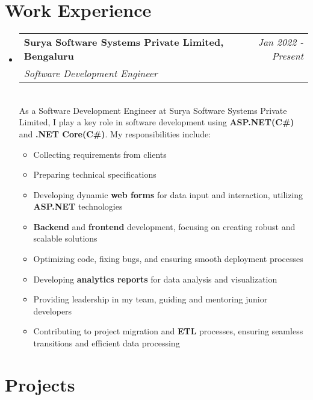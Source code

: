 \documentclass[a4paper,12pt]{article}
\makeatletter
\newcommand{\resumeSubHeadingListStart}{\begin{itemize}[leftmargin=*,labelsep=1mm,noitemsep]}
\newcommand{\resumeSubHeadingListEnd}{\end{itemize}\vspace{2mm}}
\newcommand{\resumeItemListStart}{\begin{itemize}[leftmargin=3ex, rightmargin=2ex, noitemsep,labelsep=1.2mm,itemsep=0mm]\small}
\newcommand{\resumeItemListEnd}{\end{itemize}\vspace{-2mm}}
\newcommand{\resumeExperience}[4]{
\vspace{0.5mm}\item
    \begin{tabular*}{0.98\textwidth}[t]{l@{\extracolsep{\fill}}r}
        \textbf{#1} & \textit{\footnotesize{#3}}\\
        \textit{\footnotesize{#2}} & {}
    \end{tabular*}\\ [1mm]
    \footnotesize{#4}
}
\newcommand{\emptyLine}{\\[-3mm]}
\makeatother
\begin{document}
\section{Work Experience}

\resumeSubHeadingListStart
\resumeExperience {Surya Software Systems Private Limited, Bengaluru}
 {Software Development Engineer} {Jan 2022 - Present}
{
As a Software Development Engineer at Surya Software Systems Private Limited, I play a key role in software development using \textbf{ASP.NET(C\#)} and \textbf{.NET Core(C\#)}. My responsibilities include:
}\emptyLine
\resumeItemListStart
    \item Collecting requirements from clients
    \item Preparing technical specifications
    \item Developing dynamic \textbf{web forms} for data input and interaction, utilizing \textbf{ASP.NET} technologies
    \item \textbf{Backend} and \textbf{frontend} development, focusing on creating robust and scalable solutions
    \item Optimizing code, fixing bugs, and ensuring smooth deployment processes
    \item Developing \textbf{analytics reports} for data analysis and visualization
    \item Providing leadership in my team, guiding and mentoring junior developers
    \item Contributing to project migration and \textbf{ETL} processes, ensuring seamless transitions and efficient data processing
    \resumeItemListEnd
\resumeSubHeadingListEnd

\section{Projects}
\end{document}
